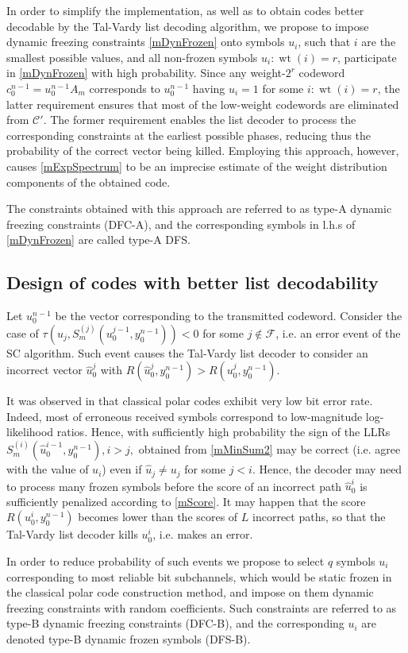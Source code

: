 \documentclass[conference]{IEEEtran}
\DeclareMathOperator{\wt}{wt}
\theoremstyle{plain}
\newcommand{\mF}{\mathcal F}
\begin{document}
In order to simplify the implementation, as well as to obtain codes better decodable by the Tal-Vardy list decoding algorithm, we propose to impose dynamic freezing constraints \eqref{mDynFrozen} onto symbols $u_i$, such that $i$ are the smallest possible values, and all non-frozen symbols $u_i: \wt(i)=r$, participate in \eqref{mDynFrozen} with high probability. Since any weight-$2^r$ codeword $c_0^{n-1}=u_0^{n-1}A_m$ corresponds to $u_0^{n-1}$ having $u_i=1$ for some $i:\wt(i)=r$, the latter requirement ensures that most of the low-weight codewords are eliminated from $\mathcal C'$. The former requirement enables the list decoder to process the corresponding constraints at the earliest possible phases, reducing thus the probability of the correct vector  being killed. Employing this approach, however, causes \eqref{mExpSpectrum} to be an imprecise estimate of the weight distribution components of the obtained code.

The constraints obtained with this approach are referred to as type-A dynamic freezing constraints (DFC-A), and the corresponding symbols in l.h.s of \eqref{mDynFrozen} are called type-A DFS. 
\subsection{Design of codes with better list decodability}
Let $u_0^{n-1}$ be the vector corresponding to the transmitted codeword. Consider the case of $\tau(u_j,S_m^{(j)}(u_0^{j-1},y_0^{n-1}))<0$ for some $j\notin\mF$, i.e. an error event of the SC algorithm. Such event causes the Tal-Vardy list decoder to consider an incorrect vector $\hat u_0^{j}$ with $R(\hat  u_0^{j},y_0^{n-1})>R(u_0^{j},y_0^{n-1})$.  

It was observed in \cite{arikan2011systematic} that classical polar codes exhibit very low bit error rate. Indeed, most of erroneous received symbols correspond to low-magnitude log-likelihood ratios. Hence, with sufficiently high probability the sign of the LLRs $S_m^{(i)}(\hat u_0^{i-1},y_0^{n-1}), i>j,$ obtained from \eqref{mMinSum2} may be correct (i.e. agree with the value of $u_i$) even if $\hat u_j\neq u_j$ for some $j<i$. Hence, the decoder may need to process many frozen symbols before the score of an incorrect path $\hat u_0^{i}$ is sufficiently penalized according to \eqref{mScore}.  It may happen that the score $R(u_0^i,y_0^{n-1})$ becomes lower than the scores of $L$ incorrect paths, so that the Tal-Vardy list decoder kills $u_0^i$, i.e. makes an error.


In order to reduce probability of such events we propose to select $q$ symbols $u_i$ corresponding to most reliable bit subchannels, which would be static frozen in the classical polar code construction method, and impose on them dynamic freezing constraints with random coefficients. Such constraints are referred to as type-B dynamic freezing constraints (DFC-B), and the corresponding $u_i$ are denoted type-B dynamic frozen symbols (DFS-B).
\end{document}
